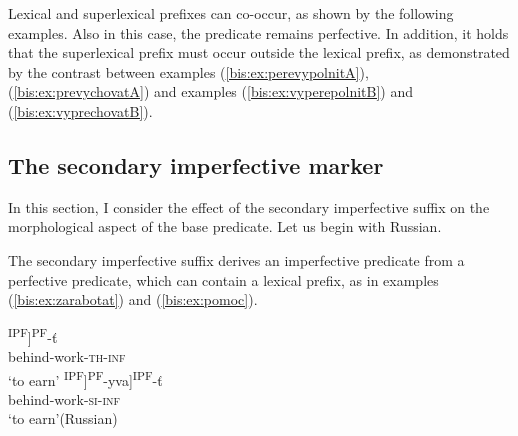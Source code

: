 \documentclass[output=paper]{langscibook}
\begin{document}
\noindent Lexical and superlexical prefixes can co-occur, as shown by the following examples. Also in this case, the predicate remains perfective. In addition, it holds that the superlexical prefix must occur outside the lexical prefix, as demonstrated by the contrast between  examples (\ref{bis:ex:perevypolnitA}), (\ref{bis:ex:prevychovatA}) and examples (\ref{bis:ex:vyperepolnitB}) and (\ref{bis:ex:vyprechovatB}).

\ea\label{bis:ex:perevypolnit}
\z

\ex\label{bis:ex:prevychovat}
\z\z

\subsection{The secondary imperfective marker}\label{bis:sec:si}
In this section, I consider the effect of the secondary imperfective suffix on the morphological aspect of the base predicate. Let us begin with Russian.

The secondary imperfective suffix derives an imperfective predicate from a perfective predicate, which can contain a lexical prefix, as in examples (\ref{bis:ex:zarabotat}) and (\ref{bis:ex:pomoc}).

\ea\label{bis:ex:zarabotat}
\ea\label{bis:ex:zarabotatA} \gll [za-[rabot-a]\textsuperscript{IPF}]\textsuperscript{PF}-ť \\ 
behind-work-\textsc{th}-\textsc{inf} \\
\glt ‘to earn’
\ex\label{bis:ex:zarabatyvatB} \gll [[za-[rabat]\textsuperscript{IPF}]\textsuperscript{PF}-yva]\textsuperscript{IPF}-ť \\  
behind-work-\textsc{si}-\textsc{inf} \\
\glt ‘to earn’\hfill (Russian)
\z
\end{document}
